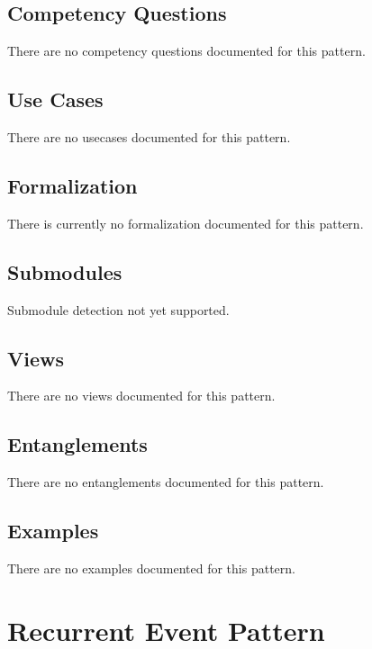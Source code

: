 \subsection{Competency Questions}
\label{ssec:cqs}
There are no competency questions documented for this pattern.

\subsection{Use Cases}
\label{ssec:use-cases}
There are no usecases documented for this pattern.
\subsection{Formalization}
\label{ssec:formalization}
There is currently no formalization documented for this pattern.

\subsection{Submodules}
\label{ssec:submodules}
Submodule detection not yet supported.

\subsection{Views}
\label{ssec:views}
There are no views documented for this pattern.


\subsection{Entanglements}
\label{ssec:entanglements}
There are no entanglements documented for this pattern.

\subsection{Examples}
\label{ssec:examples}
There are no examples documented for this pattern.


\section{Recurrent Event Pattern}
\label{sec:recurrent-event-pattern}
